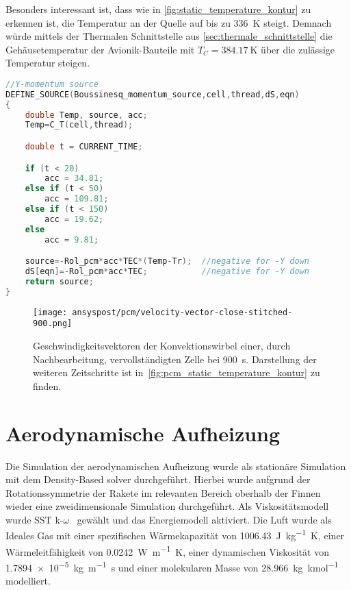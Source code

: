 Besonders interessant ist, dass wie in \ref{fig:static_temperature_kontur} zu erkennen ist, die Temperatur an der Quelle auf bis zu \SI{336}{\kelvin}
steigt. Demnach würde mittels der Thermalen Schnittstelle aus \ref{sec:thermale_schnittstelle} die Gehäusetemperatur der Avionik-Bauteile mit
$T_C = \SI{384,17}{\kelvin}$ über die zulässige Temperatur steigen.

\begin{lstlisting}[language=C, float, caption={Boussinesq-Approximation des Auftriebs im \ac{pcm} in der \ac{udf} eicosane.c}, label={lst:udf_bossinesque}]
//Y-momentum source
DEFINE_SOURCE(Boussinesq_momentum_source,cell,thread,dS,eqn)
{
	double Temp, source, acc;
	Temp=C_T(cell,thread);

	double t = CURRENT_TIME;

	if (t < 20)
		acc = 34.81;
	else if (t < 50)
		acc = 109.81;
	else if (t < 150)
		acc = 19.62;
	else
		acc = 9.81;

	source=-Rol_pcm*acc*TEC*(Temp-Tr);  //negative for -Y down
	dS[eqn]=-Rol_pcm*acc*TEC; 			//negative for -Y down
	return source;
}
\end{lstlisting}

\begin{figure}
  \centering
  \texttt{[image: ansyspost/pcm/velocity-vector-close-stitched-900.png]}
  \caption{Geschwindigkeitsvektoren der Konvektionswirbel einer, durch Nachbearbeitung, vervollständigten Zelle
  bei \SI{900}{\second}. Darstellung der weiteren Zeitschritte ist in~\ref{fig:pcm_static_temperature_kontur} zu finden.}\label{fig:pcm_vectoren_stitched}
\end{figure}

\section{Aerodynamische Aufheizung}\label{sec:sim_aerodynamisch}
Die Simulation der aerodynamischen Aufheizung wurde als stationäre Simulation mit dem Density-Based solver durchgeführt. Hierbei wurde
aufgrund der Rotationssymmetrie der Rakete im relevanten Bereich oberhalb der Finnen wieder eine zweidimensionale Simulation durchgeführt.
Als Viskositätsmodell wurde SST k-$\omega$~\cite{Irving-2021} gewählt und das Energiemodell aktiviert.
Die Luft wurde als Ideales Gas mit einer spezifischen Wärmekapazität von \SI{1006.43}{\joule\per\kilogram\kelvin},
einer Wärmeleitfähigkeit von \SI{0.0242}{\watt\per\meter\kelvin}, einer dynamischen Viskosität von \SI{1.7894e-5}{\kilogram\per\meter\second}
und einer molekularen Masse von \SI{28,966}{\kilogram\per\kilo\mole} modelliert.

